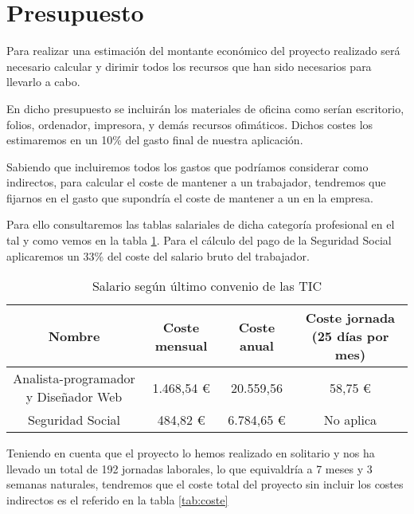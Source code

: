 
\section{Presupuesto}

Para realizar una estimación del montante económico del proyecto realizado será
necesario calcular y dirimir todos los recursos que han sido necesarios para
llevarlo a cabo.

En dicho presupuesto se incluirán los materiales de oficina como serían
escritorio, folios, ordenador, impresora, y demás recursos ofimáticos. Dichos
costes los estimaremos en un 10\% del gasto final de nuestra aplicación.

Sabiendo que incluiremos todos los gastos que podríamos considerar como
indirectos, para calcular el coste de mantener a un trabajador, tendremos que
fijarnos en el gasto que supondría el coste de mantener a un
 en la empresa.

Para ello consultaremos las tablas salariales de dicha categoría profesional en
el  tal y como vemos
en la tabla \ref{tab:salario}. Para el cálculo del pago de la Seguridad Social
aplicaremos un 33\% del coste del salario bruto del trabajador.

\begin{table}[H]
  \begin{center}
    \begin{tabular}{| c | c | c | c |}
      \hline
      Nombre & Coste mensual & Coste anual & Coste jornada (25 días por mes)\\ \hline
      Analista-programador y Diseñador Web & 1.468,54 \euro & 20.559,56
      & 58,75 \euro\\ \hline
      Seguridad Social & 484,82 \euro & 6.784,65 \euro & No aplica \\
      \hline
    \end{tabular}
  \end{center}
  \caption{Salario según último convenio de las TIC}
  \label{tab:salario}
\end{table}


Teniendo en cuenta que el proyecto lo hemos realizado en solitario y nos ha
llevado un total de 192 jornadas laborales, lo que equivaldría a 7 meses y 3
semanas naturales, tendremos que el coste total del proyecto sin incluir los
costes indirectos es el referido en la tabla \ref{tab:coste}

